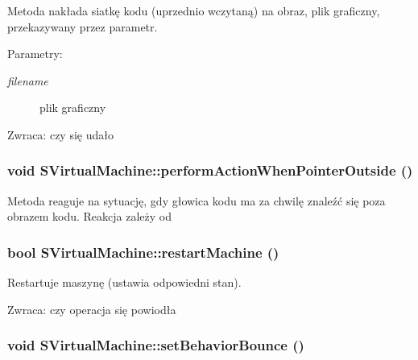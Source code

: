 Metoda nakłada siatkę kodu (uprzednio wczytaną) na obraz, plik graficzny, przekazywany przez parametr. \begin{Desc}
\item[Parametry:]
\begin{description}
\item[{\em filename}]plik graficzny \end{description}
\end{Desc}
\begin{Desc}
\item[Zwraca:]czy się udało \end{Desc}
\hypertarget{classSVirtualMachine_4d895936a3676ec3226383b3242be1af}{
\subsubsection[{performActionWhenPointerOutside}]{\setlength{\rightskip}{0pt plus 5cm}void SVirtualMachine::performActionWhenPointerOutside ()}}
\label{classSVirtualMachine_4d895936a3676ec3226383b3242be1af}


Metoda reaguje na sytuację, gdy głowica kodu ma za chwilę znaleźć się poza obrazem kodu. Reakcja zależy od \hypertarget{classSVirtualMachine_5be1048d2d6f330994a10032d9609277}{
\subsubsection[{restartMachine}]{\setlength{\rightskip}{0pt plus 5cm}bool SVirtualMachine::restartMachine ()}}
\label{classSVirtualMachine_5be1048d2d6f330994a10032d9609277}


Restartuje maszynę (ustawia odpowiedni stan). \begin{Desc}
\item[Zwraca:]czy operacja się powiodła \end{Desc}
\hypertarget{classSVirtualMachine_0b29c76aa5023f0fe0b1237024ca5103}{
\subsubsection[{setBehaviorBounce}]{\setlength{\rightskip}{0pt plus 5cm}void SVirtualMachine::setBehaviorBounce ()}}
\label{classSVirtualMachine_0b29c76aa5023f0fe0b1237024ca5103}


